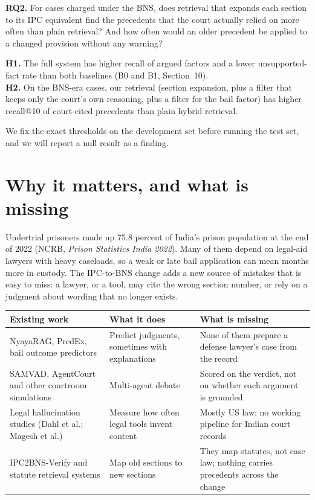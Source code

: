 \documentclass[11pt,a4paper]{article}
\begin{document}
\textbf{RQ2.} For cases charged under the BNS, does retrieval that expands each section to its IPC equivalent find the precedents that the court actually relied on more often than plain retrieval? And how often would an older precedent be applied to a changed provision without any warning?

\textbf{H1.} The full system has higher recall of argued factors and a lower unsupported-fact rate than both baselines (B0 and B1, Section~10).\\
\textbf{H2.} On the BNS-era cases, our retrieval (section expansion, plus a filter that keeps only the court's own reasoning, plus a filter for the bail factor) has higher recall@10 of court-cited precedents than plain hybrid retrieval.

We fix the exact thresholds on the development set before running the test set, and we will report a null result as a finding.

\section{Why it matters, and what is missing}

Undertrial prisoners made up 75.8 percent of India's prison population at the end of 2022 (NCRB, \emph{Prison Statistics India 2022}). Many of them depend on legal-aid lawyers with heavy caseloads, so a weak or late bail application can mean months more in custody. The IPC-to-BNS change adds a new source of mistakes that is easy to miss: a lawyer, or a tool, may cite the wrong section number, or rely on a judgment about wording that no longer exists.

{\small
\begin{xltabular}{\linewidth}{@{}P{3.6cm}P{3.6cm}L@{}}
\toprule
\textbf{Existing work} & \textbf{What it does} & \textbf{What is missing} \\
\midrule
\endhead
NyayaRAG, PredEx, bail outcome predictors & Predict judgments, sometimes with explanations & None of them prepare a defense lawyer's case from the record \\
SAMVAD, AgentCourt and other courtroom simulations & Multi-agent debate & Scored on the verdict, not on whether each argument is grounded \\
Legal hallucination studies (Dahl et al.; Magesh et al.) & Measure how often legal tools invent content & Mostly US law; no working pipeline for Indian court records \\
IPC2BNS-Verify and statute retrieval systems & Map old sections to new sections & They map statutes, not case law; nothing carries precedents across the change \\
\bottomrule
\end{xltabular}}
\end{document}
